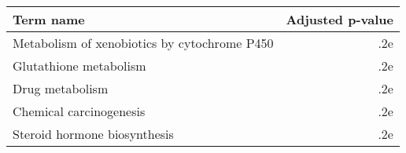 \begin{tabular}{lr}
\toprule
                                   Term name &  Adjusted p-value \\
\midrule
Metabolism of xenobiotics by cytochrome P450 &               .2e \\
                      Glutathione metabolism &               .2e \\
                             Drug metabolism &               .2e \\
                     Chemical carcinogenesis &               .2e \\
                Steroid hormone biosynthesis &               .2e \\
\bottomrule
\end{tabular}
